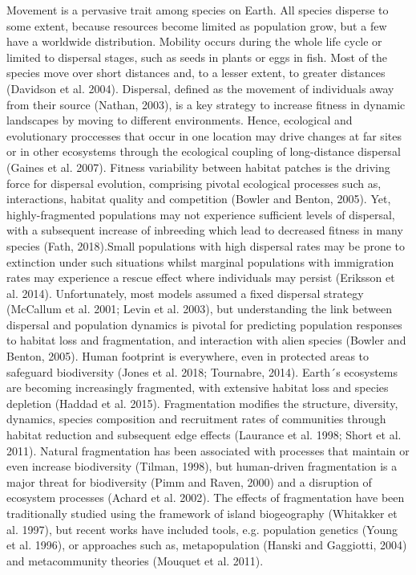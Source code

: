 \documentclass[12pt]{article}
\begin{document}
\begin{flushleft}
Movement is a pervasive trait among species on Earth. All species disperse to some extent, because resources become limited as population grow, but a few have a worldwide distribution. Mobility occurs during the whole life cycle or limited to dispersal stages, such as seeds in plants or eggs in fish. Most of the species move over short distances and, to a lesser extent, to greater distances (Davidson et al. 2004). Dispersal, defined as the movement of individuals away from their source (Nathan, 2003), is a key strategy to increase fitness in dynamic landscapes by moving to different environments. Hence, ecological and evolutionary proccesses that occur in one location may drive changes at far sites or in other ecosystems through the ecological coupling of long-distance dispersal (Gaines et al. 2007). Fitness variability between habitat patches is the driving force for dispersal evolution, comprising pivotal ecological processes such as, interactions, habitat quality and competition (Bowler and Benton, 2005). Yet, highly-fragmented populations may not experience sufficient levels of dispersal, with a subsequent increase of inbreeding which lead to decreased fitness in many species (Fath, 2018).Small populations with high dispersal rates may be prone to extinction under such situations  whilst marginal populations with immigration rates may experience a rescue effect where individuals may persist (Eriksson et al. 2014). Unfortunately, most models assumed a fixed dispersal strategy (McCallum et al. 2001; Levin et al. 2003), but understanding the link between dispersal and population dynamics is pivotal for predicting population responses to habitat loss and fragmentation, and interaction with alien species (Bowler and Benton, 2005).
Human footprint is everywhere, even in protected areas to safeguard biodiversity (Jones et al. 2018; Tournabre, 2014). Earth´s ecosystems are becoming increasingly fragmented, with extensive habitat loss and species depletion (Haddad et al. 2015). Fragmentation modifies the structure, diversity, dynamics, species composition and recruitment rates of communities through habitat reduction and subsequent edge effects (Laurance et al. 1998; Short et al. 2011). Natural fragmentation has been associated with processes that maintain or even increase biodiversity (Tilman, 1998), but human-driven fragmentation is a major threat for biodiversity (Pimm and Raven, 2000) and a disruption of ecosystem processes (Achard et al. 2002). The effects of fragmentation have been traditionally studied using the framework of island biogeography (Whitakker et al. 1997), but recent works have included tools, e.g. population genetics (Young et al. 1996), or approaches such as, metapopulation (Hanski and Gaggiotti, 2004) and metacommunity theories (Mouquet et al. 2011).

\end{flushleft}
\end{document}
